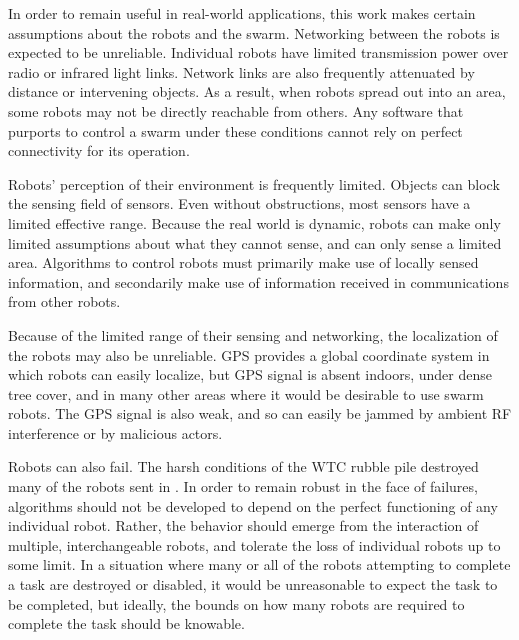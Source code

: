 \documentclass[]{article}
\begin{document}
In order to remain useful in real-world applications, this work makes certain assumptions about the robots and the swarm. 
Networking between the robots is expected to be unreliable. 
Individual robots have limited transmission power over radio or infrared light links. 
Network links are also frequently attenuated by distance or intervening objects. 
As a result, when robots spread out into an area, some robots may not be directly reachable from others. 
Any software that purports to control a swarm under these conditions cannot rely on perfect connectivity for its operation. 

Robots' perception of their environment is frequently limited. 
Objects can block the sensing field of sensors.
Even without obstructions, most sensors have a limited effective range.
Because the real world is dynamic, robots can make only limited assumptions about what they cannot sense, and can only sense a limited area. 
Algorithms to control robots must primarily make use of locally sensed information, and secondarily make use of information received in communications from other robots. 

Because of the limited range of their sensing and networking, the localization of the robots may also be unreliable. 
GPS provides a global coordinate system in which robots can easily localize, but GPS signal is absent indoors, under dense tree cover, and in many other areas where it would be desirable to use swarm robots. 
The GPS signal is also weak, and so can easily be jammed by ambient RF interference or by malicious actors. 

Robots can also fail. 
The harsh conditions of the WTC rubble pile destroyed many of the robots sent in \cite{Micire02analysisof}.
In order to remain robust in the face of failures, algorithms should not be developed to depend on the perfect functioning of any individual robot. 
Rather, the behavior should emerge from the interaction of multiple, interchangeable robots, and tolerate the loss of individual robots up to some limit. 
In a situation where many or all of the robots attempting to complete a task are destroyed or disabled, it would be unreasonable to expect the task to be completed, but ideally, the bounds on how many robots are required to complete the task should be knowable. 
\end{document}
